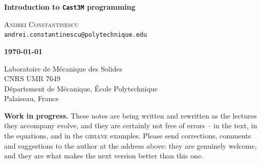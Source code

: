 \pagestyle{empty}


\begin{center}


\textbf{\huge Introduction to \texttt{Cast3M} programming}


\textsc{\Large Andrei Constantinescu} \\[0.5cm]
\texttt{andrei.constantinescu@polytechnique.edu}


\textbf{\Large \today}



\begin{small}
         Laboratoire de M\'ecanique des Solides \\ \smallskip
         CNRS UMR 7649 \\ \smallskip
         D\'epartement de M\'ecanique, \'Ecole Polytechnique \\  Palaiseau, France
\end{small}


\begin{minipage}{0.82\textwidth}
\begin{small}
\textbf{Work in progress.} These notes are being written and rewritten as the
lectures they accompany evolve, and they are certainly not free of errors --
in the text, in the equations, and in the \textsc{gibiane} examples. Please
send corrections, comments and suggestions to the author at the address
above: they are genuinely welcome, and they are what makes the next version
better than this one.
\end{small}
\end{minipage}



\end{center}

\pagestyle{plain}
